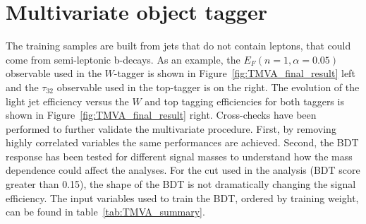 \documentclass[a4paper,11pt]{article}
\begin{document}
\section{Multivariate object tagger}%
\label{sec:app:mva}
The training samples are built from jets that do not contain leptons, that could come from semi-leptonic b-decays. As an example, the $E_{F}(n=1,\alpha=0.05)$ observable used in the $W$-tagger is shown in Figure~\ref{fig:TMVA_final_result} left and the $\tau_{32}$ observable used in the top-tagger is on the right. The evolution of the light jet efficiency versus the $W$ and top tagging efficiencies for both taggers is shown in Figure~\ref{fig:TMVA_final_result} right. Cross-checks have been performed to further validate the multivariate procedure. First, by removing highly correlated variables the same performances are achieved. Second, the BDT response has been tested for different signal masses to understand how the mass dependence could affect the analyses. For the cut used in the analysis (BDT score greater than 0.15), the shape of the BDT is not dramatically changing the signal efficiency. The input variables used to train the BDT, ordered by training weight, can be found in table~\ref{tab:TMVA_summary}.
\end{document}
